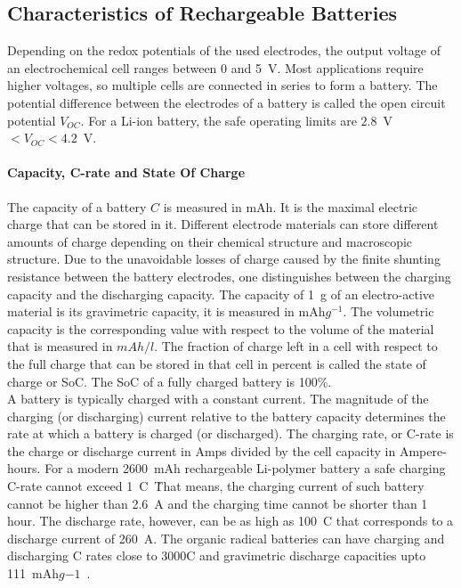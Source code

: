 
\subsection{Characteristics of Rechargeable Batteries}
Depending on the redox potentials of the used electrodes, the output voltage of an electrochemical cell ranges between 0 and 5~V. Most applications require higher voltages, so multiple cells are connected in series to form a battery. The potential difference between the electrodes of a battery is called the open circuit potential $V_{OC}$. For a Li-ion battery, the safe operating limits are $2.8$~V~$<V_{OC}<4.2$~V.\\

\paragraph{Capacity, C-rate and State Of Charge}
The capacity of a battery $C$ is measured in mAh. It is the maximal electric charge that can be stored in it. Different electrode materials can store different amounts of charge depending on their chemical structure and macroscopic structure. Due to the unavoidable losses of charge caused by the finite shunting resistance between the battery electrodes, one distinguishes between the charging capacity and the discharging capacity. The capacity of 1~g of an electro-active material is its gravimetric capacity, it is measured in mAh$g^{-1}$. The volumetric capacity is the corresponding value with respect to the volume of the material that is measured in $mAh/l$. The fraction of charge left in a cell with respect to the full charge that can be stored in that cell in percent is called the state of charge or SoC. The SoC of a fully charged battery is 100\%.\\
A battery is typically charged with a constant current. The magnitude of the charging (or discharging) current relative to the battery capacity determines the rate at which a battery is charged (or discharged). The charging rate, or C-rate is the charge or discharge current in Amps divided by the cell capacity in Ampere-hours. For a modern 2600~mAh rechargeable Li-polymer battery a safe charging C-rate cannot exceed 1~C~\. That means, the charging current of such battery cannot be higher than 2.6~A and the charging time cannot be shorter than 1 hour. The discharge rate, however, can be as high as 100~C that corresponds to a discharge current of 260~A. The organic radical batteries can have charging and discharging C rates close to 3000C and gravimetric discharge capacities upto 111~mAh$g{-1}$~\cite{Vereshchagin2020,Vereshchagin2022,Kulikov2023}.



